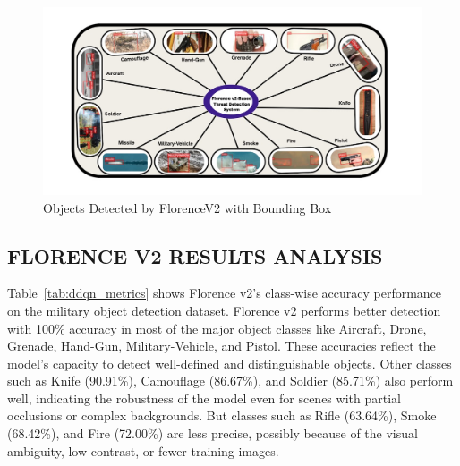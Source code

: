\documentclass[fleqn,10pt,lineno]{wlpeerj}
\begin{document}
\begin{figure} [H]
    \centering
    \includegraphics[width=1\linewidth]{detections.jpg}
    \caption{Objects Detected by FlorenceV2 with Bounding Box}
    \label{fig:obj-florence-detected}
\end{figure}

\subsection{FLORENCE V2 RESULTS ANALYSIS}

Table~\ref{tab:ddqn_metrics} shows Florence v2's class-wise accuracy performance on the military object detection dataset. Florence v2 performs better detection with 100\% accuracy in most of the major object classes like Aircraft, Drone, Grenade, Hand-Gun, Military-Vehicle, and Pistol. These accuracies reflect the model's capacity to detect well-defined and distinguishable objects. Other classes such as Knife (90.91\%), Camouflage (86.67\%), and Soldier (85.71\%) also perform well, indicating the robustness of the model even for scenes with partial occlusions or complex backgrounds. But classes such as Rifle (63.64\%), Smoke (68.42\%), and Fire (72.00\%) are less precise, possibly because of the visual ambiguity, low contrast, or fewer training images. 
\end{document}

